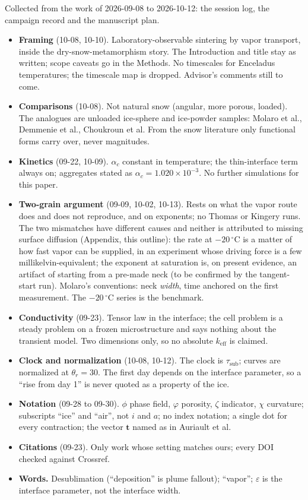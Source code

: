 \documentclass[11pt]{article}
\begin{document}
Collected from the work of 2026-09-08 to 2026-10-12: the session log, the
campaign record and the manuscript plan.
\begin{itemize}
\item \textbf{Framing} (10-08, 10-10). Laboratory-observable sintering by
  vapor transport, inside the dry-snow-metamorphism story. The Introduction
  and title stay as written; scope caveats go in the Methods. No timescales
  for Enceladus temperatures; the timescale map is dropped. Advisor's
  comments still to come.
\item \textbf{Comparisons} (10-08). Not natural snow (angular, more porous,
  loaded). The analogues are unloaded ice-sphere and ice-powder samples:
  Molaro et al., Demmenie et al., Choukroun et al. From the snow literature
  only functional forms carry over, never magnitudes.
\item \textbf{Kinetics} (09-22, 10-09). $\alpha_c$ constant in temperature;
  the thin-interface term always on; aggregates stated as $\alpha_c = 1.020
  \times 10^{-3}$. No further simulations for this paper.
\item \textbf{Two-grain argument} (09-09, 10-02, 10-13). Rests on what the
  vapor route does and does not reproduce, and on exponents; no Thomas or
  Kingery runs. The two mismatches have different causes and neither is
  attributed to missing surface diffusion (Appendix, this outline): the rate
  at $-20\,^{\circ}$C is a matter of how fast vapor can be supplied, in an
  experiment whose driving force is a few millikelvin-equivalent; the
  exponent at saturation is, on present evidence, an artifact of starting
  from a pre-made neck (to be confirmed by the tangent-start run). Molaro's conventions: neck \emph{width}, time anchored on the first
  measurement. The $-20\,^{\circ}$C series is the benchmark.
\item \textbf{Conductivity} (09-23). Tensor law in the interface; the cell
  problem is a steady problem on a frozen microstructure and says nothing
  about the transient model. Two dimensions only, so no absolute
  $k_{\mathrm{eff}}$ is claimed.
\item \textbf{Clock and normalization} (10-08, 10-12). The clock is
  $\tau_{\mathrm{sub}}$; curves are normalized at $\theta_r = 30$. The first day depends on the interface parameter, so a
  ``rise from day 1'' is never quoted as a property of the ice.
\item \textbf{Notation} (09-28 to 09-30). $\phi$ phase field, $\varphi$
  porosity, $\zeta$ indicator, $\chi$ curvature; subscripts ``ice'' and
  ``air'', not $i$ and $a$; no index notation; a single dot for every
  contraction; the vector $\mathbf{t}$ named as in Auriault et al.
\item \textbf{Citations} (09-23). Only work whose setting matches ours;
  every DOI checked against Crossref.
\item \textbf{Words.} Desublimation (``deposition'' is plume fallout);
  ``vapor''; $\varepsilon$ is the interface parameter, not the interface
  width.
\end{itemize}
\end{document}
